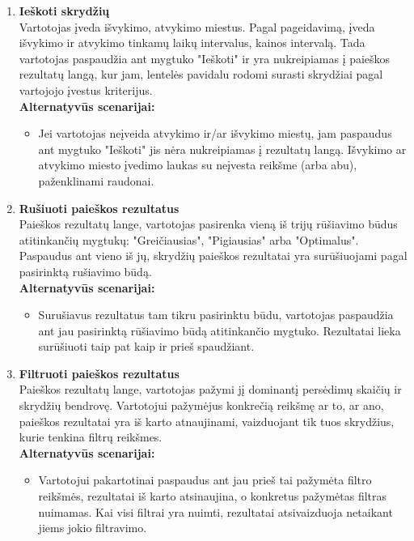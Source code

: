 \documentclass{VUMIFPSkursinis}
\begin{document}
                \begin{enumerate}[label=\textbf{U\arabic*}.]

                    \item \textbf{Ieškoti skrydžių}\\
                    Vartotojas įveda išvykimo, atvykimo miestus. Pagal pageidavimą, įveda išvykimo ir atvykimo tinkamų laikų intervalus, kainos intervalą. Tada vartotojas paspaudžia ant mygtuko "Ieškoti" ir yra nukreipiamas į paieškos rezultatų langą, kur jam, lentelės pavidalu rodomi surasti skrydžiai pagal vartojojo įvestus kriterijus.
                    \\\textbf{Alternatyvūs scenarijai:}
                    \begin{itemize}
                        \item Jei vartotojas neįveida atvykimo ir/ar išvykimo miestų, jam paspaudus ant mygtuko "Ieškoti" jis nėra nukreipiamas į rezultatų langą. Išvykimo ar atvykimo miesto įvedimo laukas su neįvesta reikšme (arba abu), paženklinami raudonai.
                    \end{itemize}

                    \item \textbf{Rušiuoti paieškos rezultatus}\\
                    Paieškos rezultatų lange, vartotojas pasirenka vieną iš trijų rūšiavimo būdus atitinkančių mygtukų: "Greičiausias", "Pigiausias" arba "Optimalus". Paspaudus ant vieno iš jų, skrydžių paieškos rezultatai yra surūšiuojami pagal pasirinktą rušiavimo būdą.
                    \\\textbf{Alternatyvūs scenarijai:}
                    \begin{itemize}
                        \item Surušiavus rezultatus tam tikru pasirinktu būdu, vartotojas paspaudžia ant jau pasirinktą rūšiavimo būdą atitinkančio mygtuko. Rezultatai lieka surūšiuoti taip pat kaip ir prieš spaudžiant. 
                    \end{itemize}

                    \item \textbf{Filtruoti paieškos rezultatus}\\
                    Paieškos rezultatų lange, vartotojas pažymi jį dominantį persėdimų skaičių ir skrydžių bendrovę. Vartotojui pažymėjus konkrečią reikšmę ar to, ar ano, paieškos rezultatai yra iš karto atnaujinami, vaizduojant tik tuos skrydžius, kurie tenkina filtrų reikšmes.
                    \\\textbf{Alternatyvūs scenarijai:}
                    \begin{itemize}
                        \item Vartotojui pakartotinai paspaudus ant jau prieš tai pažymėta filtro reikšmės, rezultatai iš karto atsinaujina, o konkretus pažymėtas filtras nuimamas. Kai visi filtrai yra nuimti, rezultatai atsivaizduoja netaikant jiems jokio filtravimo.
                    \end{itemize}


\end{enumerate}
\end{document}

